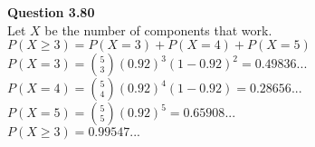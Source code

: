 \documentclass{article}
\begin{document}
    \textbf{Question 3.80}\\
    Let $X$ be the number of components that work. $P(X\geq 3) = P(X=3) + P(X=4) + P(X=5)$\\
    $P(X=3) = \binom{5}{3}(0.92)^3(1-0.92)^2 = 0.49836...$\\
    $P(X=4) = \binom{5}{4}(0.92)^4(1-0.92) = 0.28656...$\\
    $P(X=5) = \binom{5}{5}(0.92)^5 = 0.65908...$\\
    $P(X\geq 3) = 0.99547...$
\end{document}
